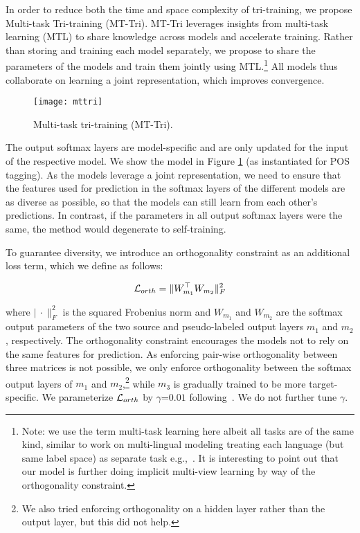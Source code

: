 \documentclass[11pt,a4paper]{article}
\begin{document}
In order to reduce both the time and space complexity of tri-training, we propose Multi-task Tri-training (MT-Tri). MT-Tri leverages insights from multi-task learning (MTL) \cite{Caruana1993} to share knowledge across models and accelerate training. Rather than storing and training each model separately, we propose to share the parameters of the models and train them jointly using MTL.\footnote{Note: we use the term multi-task learning here albeit all tasks are of the same kind, similar to work on multi-lingual modeling treating each language (but same label space) as separate task e.g.,~\cite{fang2017model}. It is interesting to point out that our model is  further doing implicit multi-view learning by way of the orthogonality constraint.} All models thus collaborate on learning a joint representation, which improves convergence. 

\begin{figure}[]\centering
\texttt{[image: mttri]}
\caption{Multi-task tri-training (MT-Tri).}
\label{fig:model}
\end{figure}

The output softmax layers are model-specific and are only updated for the input of the respective model. We show the model in Figure \ref{fig:model} (as instantiated for POS tagging). As the models leverage a joint representation, we need to ensure that the features used for prediction in the softmax layers of the different models are as diverse as possible, so that the models can still learn from each other's predictions. In contrast, if the parameters in all output softmax layers were the same, the method would degenerate to self-training.

To guarantee diversity, we introduce an orthogonality constraint \cite{Bousmalis2016} as an additional loss term, which we define as follows:

\begin{equation}
{\cal L}_{orth} = \|W_{m_1}^\top W_{m_2}\|^2_F 
\end{equation}

where $|\ \cdot \|^2_F$ is the squared Frobenius norm and $W_{m_1}$ and $W_{m_2}$ are the softmax output parameters of the two source and pseudo-labeled output layers $m_1$ and $m_2$, respectively. The orthogonality constraint encourages the models not to rely on the same features for prediction. As enforcing pair-wise orthogonality between three matrices is not possible, we only enforce orthogonality between the softmax output layers of $m_1$ and $m_2$,\footnote{We also tried enforcing orthogonality on a hidden layer rather than the output layer, but this did not help.} while $m_3$ is gradually trained to be more target-specific. We parameterize ${\cal L}_{orth}$ by $\gamma$=$0.01$ following~\cite{Liu:ea:2017:ACL}. We do not further tune $\gamma$.
\end{document}
